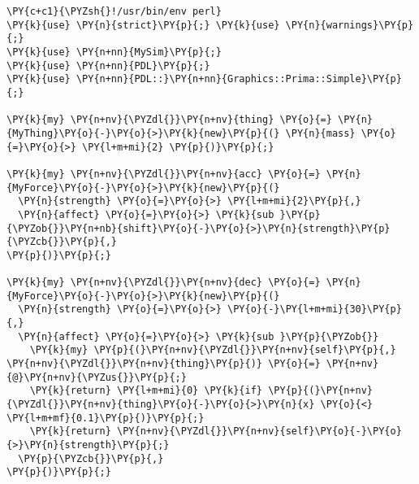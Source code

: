 \begin{Verbatim}[commandchars=\\\{\}]
\PY{c+c1}{\PYZsh{}!/usr/bin/env perl}
\PY{k}{use} \PY{n}{strict}\PY{p}{;} \PY{k}{use} \PY{n}{warnings}\PY{p}{;}
\PY{k}{use} \PY{n+nn}{MySim}\PY{p}{;}
\PY{k}{use} \PY{n+nn}{PDL}\PY{p}{;}
\PY{k}{use} \PY{n+nn}{PDL::}\PY{n+nn}{Graphics::Prima::Simple}\PY{p}{;}

\PY{k}{my} \PY{n+nv}{\PYZdl{}}\PY{n+nv}{thing} \PY{o}{=} \PY{n}{MyThing}\PY{o}{-}\PY{o}{>}\PY{k}{new}\PY{p}{(} \PY{n}{mass} \PY{o}{=}\PY{o}{>} \PY{l+m+mi}{2} \PY{p}{)}\PY{p}{;}

\PY{k}{my} \PY{n+nv}{\PYZdl{}}\PY{n+nv}{acc} \PY{o}{=} \PY{n}{MyForce}\PY{o}{-}\PY{o}{>}\PY{k}{new}\PY{p}{(}
  \PY{n}{strength} \PY{o}{=}\PY{o}{>} \PY{l+m+mi}{2}\PY{p}{,}
  \PY{n}{affect} \PY{o}{=}\PY{o}{>} \PY{k}{sub }\PY{p}{\PYZob{}}\PY{n+nb}{shift}\PY{o}{-}\PY{o}{>}\PY{n}{strength}\PY{p}{\PYZcb{}}\PY{p}{,}
\PY{p}{)}\PY{p}{;}

\PY{k}{my} \PY{n+nv}{\PYZdl{}}\PY{n+nv}{dec} \PY{o}{=} \PY{n}{MyForce}\PY{o}{-}\PY{o}{>}\PY{k}{new}\PY{p}{(}
  \PY{n}{strength} \PY{o}{=}\PY{o}{>} \PY{o}{-}\PY{l+m+mi}{30}\PY{p}{,}
  \PY{n}{affect} \PY{o}{=}\PY{o}{>} \PY{k}{sub }\PY{p}{\PYZob{}}
    \PY{k}{my} \PY{p}{(}\PY{n+nv}{\PYZdl{}}\PY{n+nv}{self}\PY{p}{,} \PY{n+nv}{\PYZdl{}}\PY{n+nv}{thing}\PY{p}{)} \PY{o}{=} \PY{n+nv}{@}\PY{n+nv}{\PYZus{}}\PY{p}{;}
    \PY{k}{return} \PY{l+m+mi}{0} \PY{k}{if} \PY{p}{(}\PY{n+nv}{\PYZdl{}}\PY{n+nv}{thing}\PY{o}{-}\PY{o}{>}\PY{n}{x} \PY{o}{<} \PY{l+m+mf}{0.1}\PY{p}{)}\PY{p}{;}
    \PY{k}{return} \PY{n+nv}{\PYZdl{}}\PY{n+nv}{self}\PY{o}{-}\PY{o}{>}\PY{n}{strength}\PY{p}{;}
  \PY{p}{\PYZcb{}}\PY{p}{,}
\PY{p}{)}\PY{p}{;}
\end{Verbatim}
